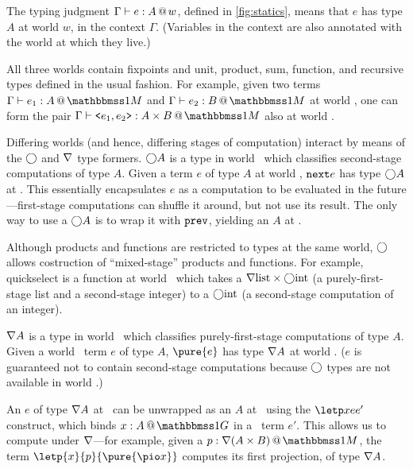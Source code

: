 \begin{abstrsyn}

The typing judgment $\Gamma{} \vdash {e}:{A}~\hspace{-0.15em}\text{@}\hspace{-0.2em}~w$, defined in \ref{fig:statics}, means that
$e$ has type $A$ at world $w$, in the context $\Gamma$. (Variables in the
context are also annotated with the world at which they live.)

All three worlds contain fixpoints and unit, product, sum, function, and
recursive types defined in the usual fashion. For example, given two terms
$\typesone{e_1}A$ and $\typesone{e_2}B$ at world \bbonem, one can form the pair
$\typesone{\texttt{<}e_1,e_2\texttt{>}}{A\times B}$ also at world \bbonem. 

Differing worlds (and hence, differing stages of computation) interact by means
of the $\bigcirc$ and $\nabla$ type formers. $\bigcirc A$ is a type in world \bbonem\
which classifies second-stage computations of type $A$. Given a term $e$ of type
$A$ at world \bbtwo, ${\tt next}{e}$ has type $\bigcirc A$ at \bbonem. This essentially
encapsulates $e$ as a computation to be evaluated in the future---first-stage
computations can shuffle it around, but not use its result.  The only way to use
a $\bigcirc A$ is to wrap it with ${\tt prev}$, yielding an $A$ at \bbtwo.


Although products and functions are restricted to types at the same world,
$\bigcirc$ allows costruction of ``mixed-stage'' products and functions.
For example, quickselect is a function at world \bbonem\ which takes a
$\nabla{\rm list} \times \bigcirc{\rm int}$ (a purely-first-stage list and a
second-stage integer) to a $\bigcirc{\rm int}$ (a second-stage
computation of an integer).

$\nabla A$ is a type in world \bbonem\ which classifies purely-first-stage
computations of type $A$. Given a world \bbonep\ term $e$ of type $A$,
$\pure{e}$ has type $\nabla A$ at world \bbonem. ($e$ is guaranteed not to contain
second-stage computations because $\bigcirc$ types are not available in world
\bbonep.)

An $e$ of type $\nabla A$ at \bbonem\ can be unwrapped as an $A$ at \bbonep\
using the $\letp xe{e'}$ construct, which binds $\colpure xA$ in a \bbonem\ term
$e'$. This allows us to compute under $\nabla$---for example, given a $\colmix
p{\curr(A\times B)}$, the term $\letp{x}{p}{\pure{\pio x}}$ computes its first
projection, of type $\nabla A$.


\end{abstrsyn}
